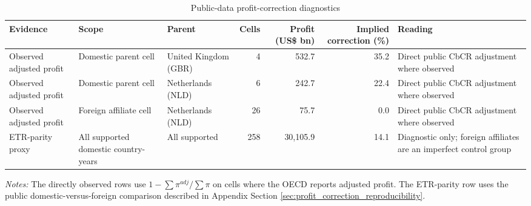 \begin{table}[H]
\centering
\scriptsize
\caption{Public-data profit-correction diagnostics}
\label{tab:app_profit_correction_direct_validation}
\begin{adjustbox}{max width=\textwidth,center}
\begin{tabular}{@{}L{2.4cm}L{3.1cm}L{2.8cm}rrrL{4.2cm}@{}}
\toprule
Evidence & Scope & Parent & Cells & Profit (US\$ bn) & Implied correction (\%) & Reading \\
\midrule
Observed adjusted profit & Domestic parent cell & United Kingdom (GBR) &   4 &    532.7 & 35.2 & Direct public CbCR adjustment where observed \\
Observed adjusted profit & Domestic parent cell & Netherlands (NLD) &   6 &    242.7 & 22.4 & Direct public CbCR adjustment where observed \\
Observed adjusted profit & Foreign affiliate cell & Netherlands (NLD) &  26 &     75.7 &  0.0 & Direct public CbCR adjustment where observed \\
ETR-parity proxy & All supported domestic country-years & All supported & 258 & 30,105.9 & 14.1 & Diagnostic only; foreign affiliates are an imperfect control group \\
\bottomrule
\end{tabular}
\end{adjustbox}

\vspace{0.5em}
\begin{minipage}{0.96\textwidth}
\footnotesize\raggedright \textit{Notes:} The directly observed rows use $1-\sum\pi^{adj}/\sum\pi$ on cells where the OECD reports adjusted profit. The ETR-parity row uses the public domestic-versus-foreign comparison described in Appendix Section \ref{sec:profit_correction_reproducibility}.
\end{minipage}
\end{table}

